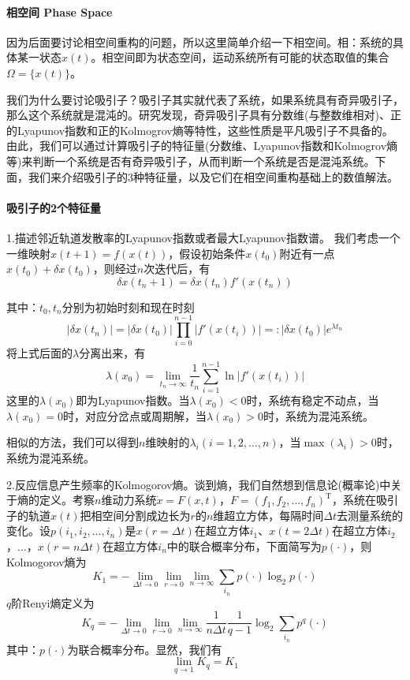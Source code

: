         \paragraph{相空间 Phase Space}因为后面要讨论相空间重构的问题，所以这里简单介绍一下相空间。相：系统的具体某一状态$x(t)$。相空间即为状态空间，运动系统所有可能的状态取值的集合$\Omega=\{x(t)\}$。
        \par
        我们为什么要讨论吸引子？吸引子其实就代表了系统，如果系统具有奇异吸引子，那么这个系统就是混沌的。研究发现，奇异吸引子具有分数维(与整数维相对)、正的Lyapunov指数和正的Kolmogrov熵等特性，这些性质是平凡吸引子不具备的。由此，我们可以通过计算吸引子的特征量(分数维、Lyapunov指数和Kolmogrov熵等)来判断一个系统是否有奇异吸引子，从而判断一个系统是否是混沌系统。下面，我们来介绍吸引子的3种特征量，以及它们在相空间重构基础上的数值解法。

        \paragraph{吸引子的2个特征量}1.描述邻近轨道发散率的Lyapunov指数或者最大Lyapunov指数谱。
        我们考虑一个一维映射$x(t+1)=f(x(t))$，假设初始条件$x(t_0)$附近有一点$x(t_0)+\delta x(t_0)$，则经过$n$次迭代后，有
        \[
            \delta x(t_n+1) = \delta x(t_n) f'(x(t_n))
        \]
        \par
        其中：$t_0,t_n$分别为初始时刻和现在时刻
        \[
            |\delta x(t_n)| = |\delta x(t_0)|\prod_{i=0}^{n-1}|f'(x(t_i))| =: |\delta x(t_0)|e^{\lambda t_n}
        \]
        将上式后面的$\lambda$分离出来，有
        \[
            \lambda (x_0) = \lim_{t_n\rightarrow\infty} \frac{1}{t_n} \sum_{i=1}^{n-1}\ln |f'(x(t_i))|
        \]
        这里的$\lambda (x_0)$即为Lyapunov指数。当$\lambda (x_0)<0$时，系统有稳定不动点，当$\lambda (x_0)=0$时，对应分岔点或周期解，当$\lambda (x_0)>0$时，系统为混沌系统。
        \par
        相似的方法，我们可以得到$n$维映射的$\lambda _i (i=1,2,\dots ,n)$，当$\max (\lambda _i)>0$时，系统为混沌系统。
        \par
        2.反应信息产生频率的Kolmogorov熵。谈到熵，我们自然想到信息论(概率论)中关于熵的定义。考察$n$维动力系统$\dot{x}=F(x,t)$，$F=(f_1,f_2,\dots ,f_n)^\mathrm{T}$，系统在吸引子的轨道$x(t)$把相空间分割成边长为$r$的$n$维超立方体，每隔时间$\Delta t$去测量系统的变化。设$p(i_1,i_2,\dots ,i_n)$是$x(r=\Delta t)$在超立方体$i_1$、$x(t=2\Delta t)$在超立方体$i_2$，$\dots$，$x(r=n \Delta t)$在超立方体$i_n$中的联合概率分布，下面简写为$p(\cdot)$，则Kolmogorov熵为
        \[
            K_1 = -\lim _{\Delta t \rightarrow 0}\lim _{r \rightarrow 0}\lim _{n\rightarrow \infty} \sum _{i_n}p(\cdot)\log_2p(\cdot)
        \]
        $q$阶Renyi熵定义为
        \[
            K_q = -\lim _{\Delta t \rightarrow 0}\lim _{r \rightarrow 0}\lim _{n\rightarrow \infty} \frac{1}{n\Delta t} \frac{1}{q-1}\log_2\sum _{i_n}p^q(\cdot)
        \]
        其中：$p(\cdot)$为联合概率分布。显然，我们有
        \[
            \lim _{q\rightarrow 1} K_q = K_1
        \]
